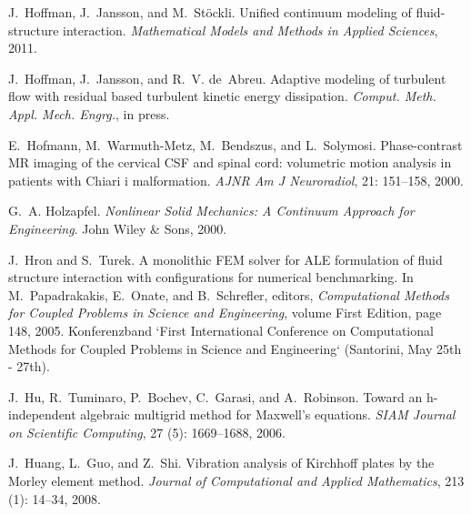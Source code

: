 \begin{thebibliography}{467}
J.~Hoffman, J.~Jansson, and M.~St\"ockli.
\newblock Unified continuum modeling of fluid-structure interaction.
\newblock \emph{Mathematical Models and Methods in Applied Sciences}, 2011.

J.~Hoffman, J.~Jansson, and R.~V. de~Abreu.
\newblock Adaptive modeling of turbulent flow with residual based turbulent
  kinetic energy dissipation.
\newblock \emph{Comput. Meth. Appl. Mech. Engrg.}, in press.

E.~Hofmann, M.~Warmuth-Metz, M.~Bendszus, and L.~Solymosi.
\newblock Phase-contrast {MR} imaging of the cervical {CSF} and spinal cord:
  volumetric motion analysis in patients with {C}hiari i malformation.
\newblock \emph{AJNR Am J Neuroradiol}, 21: 151--158, 2000.

G.~A. Holzapfel.
\newblock \emph{Nonlinear Solid Mechanics: A Continuum Approach for
  Engineering}.
\newblock John Wiley \& Sons, 2000.

J.~Hron and S.~Turek.
\newblock A monolithic {FEM} solver for {ALE} formulation of fluid structure
  interaction with configurations for numerical benchmarking.
\newblock In M.~Papadrakakis, E.~Onate, and B.~Schrefler, editors,
  \emph{Computational Methods for Coupled Problems in Science and Engineering},
  volume First Edition, page 148, 2005.
\newblock Konferenzband `First International Conference on Computational
  Methods for Coupled Problems in Science and Engineering` (Santorini, May 25th
  - 27th).

J.~Hu, R.~Tuminaro, P.~Bochev, C.~Garasi, and A.~Robinson.
\newblock Toward an h-independent algebraic multigrid method for {M}axwell's
  equations.
\newblock \emph{SIAM Journal on Scientific Computing}, 27
  (5): 1669--1688, 2006.

J.~Huang, L.~Guo, and Z.~Shi.
\newblock Vibration analysis of {K}irchhoff plates by the {M}orley element
  method.
\newblock \emph{Journal of Computational and Applied Mathematics}, 213
  (1): 14--34, 2008.


\end{thebibliography}
